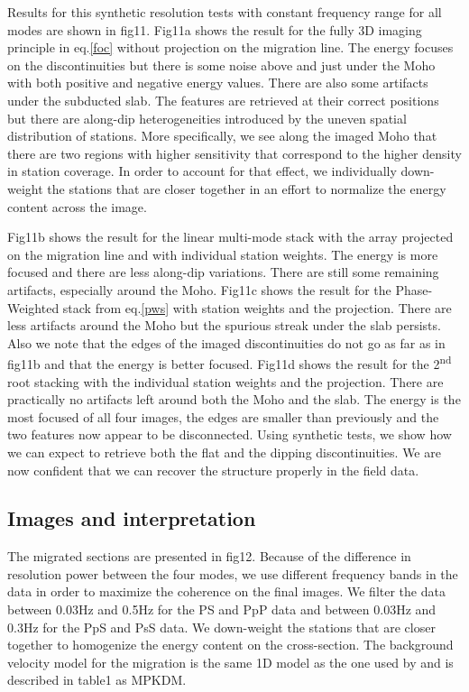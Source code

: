 \documentclass[10pt,a4paper]{article}
\numberwithin{equation}{section}
\DeclareRobustCommand{\rq}[1]{{\sethlcolor{myblue}\hl{#1}}}
\begin{document}
Results for this synthetic resolution tests with constant frequency range for all modes are shown in fig11.
Fig11a shows the result for the fully 3D imaging principle in eq.\eqref{foc} without projection on the migration line.
The energy focuses on the discontinuities but there is some noise above and just under the Moho with both positive and negative energy values.
There are also some artifacts under the subducted slab.
The features are retrieved at their correct positions but there are along-dip heterogeneities introduced by the uneven spatial distribution of stations.
More specifically, we see along the imaged Moho that there are two regions with higher sensitivity that correspond to the higher density in station coverage.
In order to account for that effect, we individually down-weight the stations that are closer together in an effort to normalize the energy content across the image.

Fig11b shows the result for the linear multi-mode stack with the array projected on the migration line and with individual station weights.
The energy is more focused and there are less along-dip variations.
There are still some remaining artifacts, especially around the Moho.
Fig11c shows the result for the Phase-Weighted stack from eq.\eqref{pws} with station weights and the projection.
There are less artifacts around the Moho but the spurious streak under the slab persists.
Also we note that the edges of the imaged discontinuities do not go as far as in fig11b and that the energy is better focused.
Fig11d shows the result for the 2\textsuperscript{nd} root stacking with the individual station weights and the projection.
There are practically no artifacts left around both the Moho and the slab.
The energy is the most focused of all four images, the edges are smaller than previously and the two features now appear to be disconnected. 
Using synthetic tests, we show how we can expect to retrieve both the flat and the dipping discontinuities.
We are now confident that we can recover the structure properly in the field data.

\subsection{Images and interpretation}

The migrated sections are presented in fig12.
Because of the difference in resolution power between the four modes, we use different frequency bands in the data in order to maximize the coherence on the final images.
We filter the data between 0.03Hz and 0.5Hz for the PS and PpP data and between 0.03Hz and 0.3Hz for the PpS and PsS data.
We down-weight the stations that are closer together to homogenize the energy content on the cross-section.
The background velocity model for the migration is the same 1D model as the one used by \cite{pear_jgr_12} and is described in table1 as MPKDM.
\end{document}
